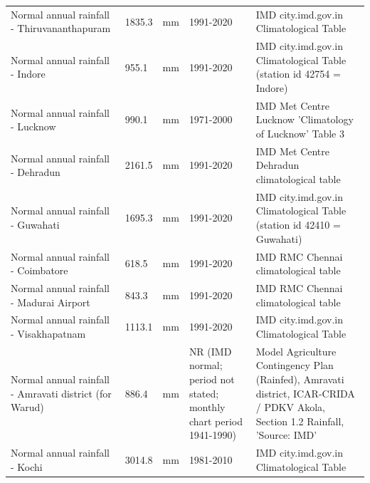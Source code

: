 {\begin{longtable}{p{4.8cm} p{2.3cm} p{1.4cm} p{2.1cm} p{5.2cm}}
Normal annual rainfall - Thiruvananthapuram & 1835.3 & mm & 1991-2020 & IMD city.imd.gov.in Climatological Table\\
Normal annual rainfall - Indore & 955.1 & mm & 1991-2020 & IMD city.imd.gov.in Climatological Table (station id 42754 = Indore)\\
Normal annual rainfall - Lucknow & 990.1 & mm & 1971-2000 & IMD Met Centre Lucknow 'Climatology of Lucknow' Table 3\\
Normal annual rainfall - Dehradun & 2161.5 & mm & 1991-2020 & IMD Met Centre Dehradun climatological table\\
Normal annual rainfall - Guwahati & 1695.3 & mm & 1991-2020 & IMD city.imd.gov.in Climatological Table (station id 42410 = Guwahati)\\
Normal annual rainfall - Coimbatore & 618.5 & mm & 1991-2020 & IMD RMC Chennai climatological table\\
Normal annual rainfall - Madurai Airport & 843.3 & mm & 1991-2020 & IMD RMC Chennai climatological table\\
Normal annual rainfall - Visakhapatnam & 1113.1 & mm & 1991-2020 & IMD city.imd.gov.in Climatological Table\\
Normal annual rainfall - Amravati district (for Warud) & 886.4 & mm & NR (IMD normal; period not stated; monthly chart period 1941-1990) & Model Agriculture Contingency Plan (Rainfed), Amravati district, ICAR-CRIDA / PDKV Akola, Section 1.2 Rainfall, 'Source: IMD'\\
Normal annual rainfall - Kochi & 3014.8 & mm & 1981-2010 & IMD city.imd.gov.in Climatological Table\\
\end{longtable}}
